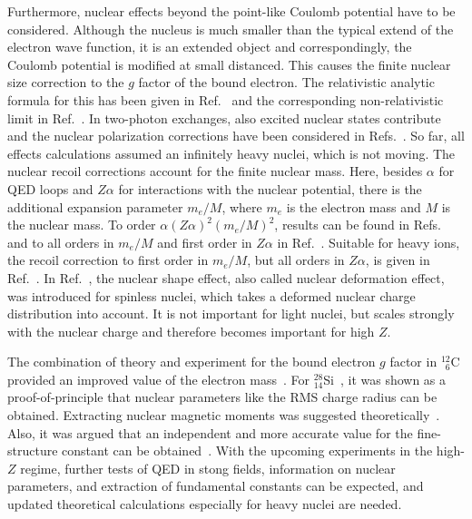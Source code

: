 Furthermore, nuclear effects beyond the point-like Coulomb potential have to be considered. Although the nucleus is much smaller than the typical extend of the electron wave function, it is an extended object and correspondingly, the Coulomb potential is modified at small distanced. This causes the finite nuclear size correction to the $g$ factor of the bound electron. The relativistic analytic formula for this has been given in Ref.~\cite{Glazov2002} and the corresponding non-relativistic limit in Ref.~\cite{karshenboim2000}. In two-photon exchanges, also excited nuclear states contribute and the nuclear polarization corrections have been considered in Refs.~\cite{Nefiodov,volotka2014}. 
So far, all effects calculations assumed an infinitely heavy nuclei, which is not moving. The nuclear recoil corrections account for the finite nuclear mass. Here, besides $\alpha$ for QED loops and $Z\alpha$ for interactions with the nuclear potential, there is the additional expansion parameter $m_e/M$, where $m_e$ is the electron mass and $M$ is the nuclear mass. To order $\alpha(Z\alpha)^2(m_e/M)^2$, results can be found in Refs.~\cite{eides2010} and to all orders in $m_e/M$ and first order in $Z\alpha$ in Ref.~\cite{pachucki2010}. Suitable for heavy ions, the recoil correction to first order in $m_e/M$, but all orders in $Z\alpha$, is given in Ref.~\cite{shabaev2001,Shabaev2002}.
In Ref.~\cite{jacek2012}, the nuclear shape effect, also called nuclear deformation effect, was introduced for spinless nuclei, which takes a deformed nuclear charge distribution into account. It is not important for light nuclei, but scales strongly with the nuclear charge and therefore becomes important for high $Z$. 

The combination of theory and experiment for the bound electron $g$ factor in $^{12}_{\phantom{0}6}$C provided an improved value of the electron mass~\cite{Sturm2014,Zatorski2017}. For $^{28}_{14}$Si~\cite{Sturm2011}, it was shown as a proof-of-principle that nuclear parameters like the RMS charge radius can be obtained. Extracting nuclear magnetic moments was suggested theoretically~\cite{Yerokhin2011,Werth2001}. Also, it was argued that an independent and more accurate value for the fine-structure constant can be obtained~\cite{Shabaev2006,yerokhin2016}. With the upcoming experiments in the high-$Z$ regime, further tests of QED in stong fields, information on nuclear parameters, and extraction of fundamental constants can be expected, and updated theoretical calculations especially for heavy nuclei are needed.
